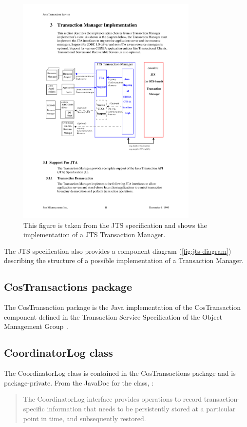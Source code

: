 \begin{figure}
\centering
\includegraphics[width=0.8\textwidth]{figures/JTSDiagram}
\caption{This figure is taken from the JTS specification and shows the implementation of a JTS Transaction Manager.}
\label{fig:jts-diagram}
\end{figure}

The JTS specification also provides a component diagram (\autoref{fig:jts-diagram}) describing the structure of a possible implementation of a Transaction Manager.

\subsection{CosTransactions package}
The CosTransaction package is the Java implementation of the CosTransaction component defined in the Transaction Service Specification of the Object Management Group~\cite{omg-ots}.

\subsection{CoordinatorLog class}
The CoordinatorLog class is contained in the CosTransactions package and is package-private. From the JavaDoc for the class, :
\begin{quote}
    The CoordinatorLog interface provides operations to record transaction-specific information that needs to be persistently stored at a particular point in time, and subsequently restored.
\end{quote}

